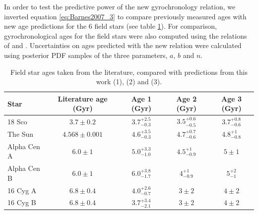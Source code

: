 \documentclass[useAMS, usenatbib]{mn2e}
\begin{document}
In order to test the predictive power of the new gyrochronology relation, we
inverted equation \ref{eq:Barnes2007_3} to compare previously measured ages
with new age predictions for the 6 field stars (see table
\ref{tab:comparison}).
For comparison, gyrochronological ages for the field stars were also computed
using the relations of \citet{Barnes2007} and \citet{Mamajek2008}.
Uncertainties on ages predicted with the new relation were calculated using
posterior PDF samples of the three parameters, $a$, $b$ and $n$.

\begin{table}
\caption{Field star ages taken from the literature, compared with
	predictions from this work (1), \citet{Mamajek2008} (2)
	and \citet{Barnes2007} (3). \label{tab:comparison}}

\begin{tabular}{lcccc}
\hline\hline
{Star} & {Literature age (Gyr)} & {Age 1 (Gyr)} & {Age 2 (Gyr)} & {Age 3 (Gyr)} \\
\hline

18 Sco      & $3.7 \pm 0.2$     & $3.7^{+2.5}_{-0.3}$ & $3.5^{+0.6}_{-0.5}$
	    & $3.7^{+0.8}_{-0.6}$ \\

The Sun     & $4.568 \pm 0.001$ & $4.6^{+3.5}_{-0.3}$ & $4.7^{+0.7}_{-0.6}$
	    & $4.8^{+1}_{-0.8}$ \\

Alpha Cen A & $6.0 \pm 1$       & $5.0^{+3.3}_{-1.0}$   & $4.5^{+1}_{-0.9}$
	    & $5\pm1$ \\

Alpha Cen B & $6.0 \pm 1$       & $6.0^{+3.8}_{-1.7}$       & $4^{+1}_{-0.9}$
	    & $5^{+2}_{-1}$ \\

16 Cyg A    & $6.8 \pm 0.4$     & $4.0^{+2.6}_{-0.7}$       & $3\pm2$
	    & $4\pm2$ \\

16 Cyg B    & $6.8 \pm 0.4$     & $3.7^{+3.4}_{-2.1}$       & $3\pm2$
	    & $4\pm2$ \\
\hline
\end{tabular}
\end{table}
\end{document}
